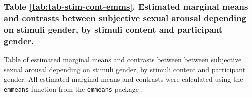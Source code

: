 \documentclass[
  bookmarksnumbered]{article}
\begin{document}
\subsubsection{Table \ref{tab:tab-stim-cont-emms}. Estimated marginal means and contrasts between subjective sexual arousal depending on stimuli gender, by stimuli content and participant gender.}\label{table-reftabtab-stim-cont-emms.-estimated-marginal-means-and-contrasts-between-subjective-sexual-arousal-depending-on-stimuli-gender-by-stimuli-content-and-participant-gender.}

Table of estimated marginal means and contrasts between between subjective sexual arousal depending on stimuli gender, by stimuli content and participant gender. All estimated marginal means and contrasts were calculated using the \texttt{emmeans} function from the \texttt{emmeans} package \autocite{emmeanscit}.
\end{document}
